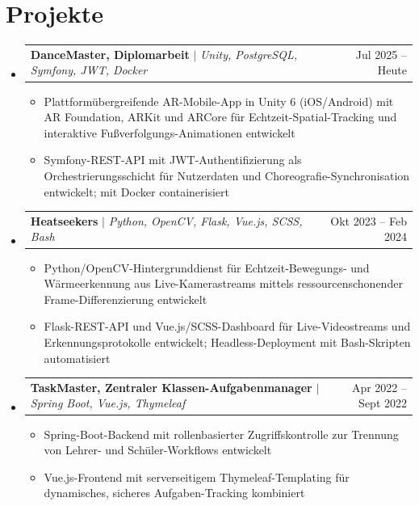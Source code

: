\documentclass[letterpaper,11pt]{article}
\makeatletter
\newcommand{\resumeItem}[1]{
  \item\small{
    {#1 \vspace{-2pt}}
  }
}
\newcommand{\resumeProjectHeading}[2]{
    \item
    \begin{tabular*}{0.97\textwidth}{l@{\extracolsep{\fill}}r}
      \small#1 & #2 \\
    \end{tabular*}\vspace{-7pt}
}
\newcommand{\resumeSubHeadingListStart}{\begin{itemize}[leftmargin=0.15in, label={}]}
\newcommand{\resumeSubHeadingListEnd}{\end{itemize}}
\newcommand{\resumeItemListStart}{\begin{itemize}}
\newcommand{\resumeItemListEnd}{\end{itemize}\vspace{-5pt}}
\makeatother
\begin{document}
\section{Projekte}
    \resumeSubHeadingListStart
      \resumeProjectHeading
          {\textbf{DanceMaster, Diplomarbeit} $|$ \emph{Unity, PostgreSQL, Symfony, JWT, Docker}}{Jul 2025 -- Heute}
          \resumeItemListStart
            \resumeItem{Plattform\"ubergreifende AR-Mobile-App in Unity 6 (iOS/Android) mit AR Foundation, ARKit und ARCore f\"ur Echtzeit-Spatial-Tracking und interaktive Fu{\ss}verfolgungs-Animationen entwickelt}
            \resumeItem{Symfony-REST-API mit JWT-Authentifizierung als Orchestrierungsschicht f\"ur Nutzerdaten und Choreografie-Synchronisation entwickelt; mit Docker containerisiert}
          \resumeItemListEnd
      \resumeProjectHeading
          {\textbf{Heatseekers} $|$ \emph{Python, OpenCV, Flask, Vue.js, SCSS, Bash}}{Okt 2023 -- Feb 2024}
          \resumeItemListStart
            \resumeItem{Python/OpenCV-Hintergrunddienst f\"ur Echtzeit-Bewegungs- und W\"armeerkennung aus Live-Kamerastreams mittels ressourcenschonender Frame-Differenzierung entwickelt}
            \resumeItem{Flask-REST-API und Vue.js/SCSS-Dashboard f\"ur Live-Videostreams und Erkennungsprotokolle entwickelt; Headless-Deployment mit Bash-Skripten automatisiert}
          \resumeItemListEnd
      \resumeProjectHeading
          {\textbf{TaskMaster, Zentraler Klassen-Aufgabenmanager} $|$ \emph{Spring Boot, Vue.js, Thymeleaf}}{Apr 2022 -- Sept 2022}
          \resumeItemListStart
            \resumeItem{Spring-Boot-Backend mit rollenbasierter Zugriffskontrolle zur Trennung von Lehrer- und Sch\"uler-Workflows entwickelt}
            \resumeItem{Vue.js-Frontend mit serverseitigem Thymeleaf-Templating f\"ur dynamisches, sicheres Aufgaben-Tracking kombiniert}
          \resumeItemListEnd
    \resumeSubHeadingListEnd


\end{document}
